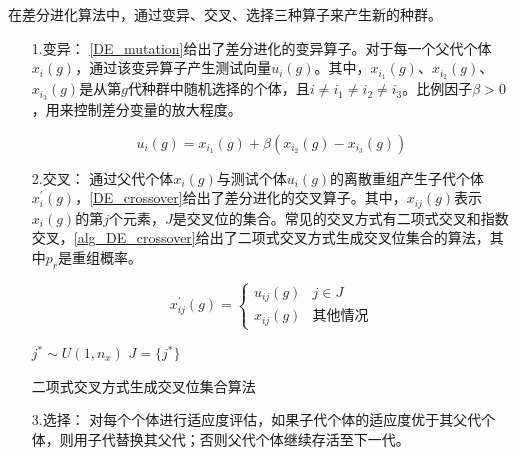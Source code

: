 在差分进化算法中，通过变异、交叉、选择三种算子来产生新的种群。
\begin{enumerate}

\item[1.变异：]\autoref{DE_mutation}给出了差分进化的变异算子。对于每一个父代个体\(x_{i}(g)\)，通过该变异算子产生测试向量\(u_{i}(g)\)。其中，\(x_{i_{1}}(g)\)、\(x_{i_{2}}(g)\)、\(x_{i_{3}}(g)\)是从第\(g\)代种群中随机选择的个体，且\(i \neq i_{1} \neq i_{2} \neq i_{3}\)。比例因子\(\beta > 0\)，用来控制差分变量的放大程度。

\begin{equation}
\label{DE_mutation}
u_{i}(g) = x_{i_{1}}(g)+\beta(x_{i_{2}}(g)-x_{i_{3}}(g))
\end{equation}

\item[2.交叉：]通过父代个体\(x_{i}(g)\)与测试个体\(u_{i}(g)\)的离散重组产生子代个体\(x^{'}_{i}(g)\)，\autoref{DE_crossover}给出了差分进化的交叉算子。其中，\(x_{ij}(g)\)表示\(x_{i}(g)\)的第\(j\)个元素，\(J\)是交叉位的集合。常见的交叉方式有二项式交叉和指数交叉，\autoref{alg_DE_crossover}给出了二项式交叉方式生成交叉位集合的算法，其中\(p_{r}\)是重组概率。


\begin{equation}
\label{DE_crossover}
x^{'}_{ij}(g)=
\begin{cases}
u_{ij}(g)& j \in J \\
x_{ij}(g)& \text{其他情况}
\end{cases}
\end{equation}


\IncMargin{1em}
\begin{algorithm}
\emph{$j^{*}\sim U \left( 1,n_{x} \right)$}\;
\emph{$J = \{j^{*}\}$}\;
\caption{二项式交叉方式生成交叉位集合算法}\label{alg_DE_crossover}
\end{algorithm}\DecMargin{1em}

\item[3.选择：]对每个个体进行适应度评估，如果子代个体的适应度优于其父代个体，则用子代替换其父代；否则父代个体继续存活至下一代。

\end{enumerate}


